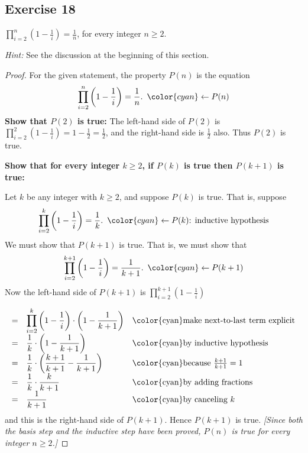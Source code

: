 \documentclass[14pt]{extarticle}
\newcommand{\dps}{\displaystyle}
\newcommand{\from}{\leftarrow}
\newcommand{\cy}{\color{cyan}}
\begin{document}
\subsection{Exercise 18}
$\dps \prod_{i=2}^{n}\left(1 - \frac{1}{i}\right) = \frac{1}{n}$, for every integer $n \geq 2$.

    {\it Hint:} See the discussion at the beginning of this section.

\begin{proof}
    For the given statement, the property $P(n)$ is the equation
    \[
        \dps \prod_{i=2}^{n}\left(1 - \frac{1}{i}\right) = \frac{1}{n}. \,\,\, {\cy \from P(n)}
    \]
    {\bf Show that $P(2)$ is true:} The left-hand side of $P(2)$ is $\dps \prod_{i=2}^{2}\left(1 - \frac{1}{i}\right) = 1 - \frac{1}{2} = \frac{1}{2}$, and the right-hand side is $\dps \frac{1}{2}$ also. Thus $P(2)$ is true.

        {\bf Show that for every integer $k \geq 2$, if $P(k)$ is true then $P(k + 1)$ is true:}

    Let $k$ be any integer with $k \geq 2$, and suppose $P(k)$ is true. That is, suppose
    \[
        \dps \prod_{i=2}^{k}\left(1 - \frac{1}{i}\right) = \frac{1}{k}. \,\,\, {\cy \from P(k) \text{: inductive hypothesis}}
    \]
    We must show that $P(k + 1)$ is true. That is, we must show that
    \[
        \dps \prod_{i=2}^{k+1}\left(1 - \frac{1}{i}\right) = \frac{1}{k+1}. \,\,\,{\cy \from P(k+1)}
    \]
    Now the left-hand side of $P(k + 1)$ is $\dps \prod_{i=2}^{k+1}\left(1 - \frac{1}{i}\right)$

    \[
        \begin{array}{lll}
            = & \dps \prod_{i=2}^{k}\left(1 - \frac{1}{i}\right) \cdot \left(1 - \frac{1}{k+1}\right) & \text{\cy make next-to-last term explicit} \\
            = & \dps \frac{1}{k} \cdot \left(1 - \frac{1}{k+1}\right)                                 & \text{\cy by inductive hypothesis}         \\
            = & \dps \frac{1}{k} \cdot \left(\frac{k+1}{k+1} - \frac{1}{k+1}\right)                   & \text{\cy because $\frac{k+1}{k+1} = 1$}   \\
            = & \dps \frac{1}{k} \cdot \frac{k}{k+1}                                                  & \text{\cy by adding fractions}             \\
            = & \dps \frac{1}{k+1}                                                                    & \text{\cy by canceling $k$}
        \end{array}
    \]
    and this is the right-hand side of $P(k + 1)$. Hence $P(k + 1)$ is true. {\it [Since both the basis step and the inductive step have been proved, $P(n)$ is true for every integer $n \geq 2$.]}
\end{proof}
\end{document}
